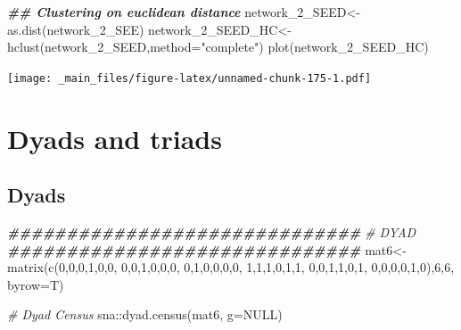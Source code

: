\documentclass[
  notitlepage,
  onecolumn,
  openany]{book}
\newenvironment{Shaded}{\begin{snugshade}}{\end{snugshade}}
\newcommand{\AttributeTok}[1]{\textcolor[rgb]{0.77,0.63,0.00}{#1}}
\newcommand{\CommentTok}[1]{\textcolor[rgb]{0.56,0.35,0.01}{\textit{#1}}}
\newcommand{\ConstantTok}[1]{\textcolor[rgb]{0.00,0.00,0.00}{#1}}
\newcommand{\DecValTok}[1]{\textcolor[rgb]{0.00,0.00,0.81}{#1}}
\newcommand{\DocumentationTok}[1]{\textcolor[rgb]{0.56,0.35,0.01}{\textbf{\textit{#1}}}}
\newcommand{\FunctionTok}[1]{\textcolor[rgb]{0.00,0.00,0.00}{#1}}
\newcommand{\NormalTok}[1]{#1}
\newcommand{\OtherTok}[1]{\textcolor[rgb]{0.56,0.35,0.01}{#1}}
\newcommand{\SpecialCharTok}[1]{\textcolor[rgb]{0.00,0.00,0.00}{#1}}
\newcommand{\StringTok}[1]{\textcolor[rgb]{0.31,0.60,0.02}{#1}}
\begin{document}
\begin{Shaded}
\begin{Highlighting}[]
\DocumentationTok{\#\# Clustering on euclidean distance}
\NormalTok{network\_2\_SEED}\OtherTok{\textless{}{-}}\FunctionTok{as.dist}\NormalTok{(network\_2\_SEE)}
\NormalTok{network\_2\_SEED\_HC}\OtherTok{\textless{}{-}}\FunctionTok{hclust}\NormalTok{(network\_2\_SEED,}\AttributeTok{method=}\StringTok{"complete"}\NormalTok{)}
\FunctionTok{plot}\NormalTok{(network\_2\_SEED\_HC)}
\end{Highlighting}
\end{Shaded}

\texttt{[image: \_main\_files/figure-latex/unnamed-chunk-175-1.pdf]}

\hypertarget{dyads-and-triads}{%
\chapter{Dyads and triads}\label{dyads-and-triads}}

\hypertarget{dyads-1}{%
\section{Dyads}\label{dyads-1}}

\begin{Shaded}
\begin{Highlighting}[]
\DocumentationTok{\#\#\#\#\#\#\#\#\#\#\#\#\#\#\#\#\#\#\#\#\#\#\#\#\#\#\#\#\#\#}
\CommentTok{\# DYAD}
\DocumentationTok{\#\#\#\#\#\#\#\#\#\#\#\#\#\#\#\#\#\#\#\#\#\#\#\#\#\#\#\#\#\#}
\NormalTok{mat6}\OtherTok{\textless{}{-}}\FunctionTok{matrix}\NormalTok{(}\FunctionTok{c}\NormalTok{(}\DecValTok{0}\NormalTok{,}\DecValTok{0}\NormalTok{,}\DecValTok{0}\NormalTok{,}\DecValTok{1}\NormalTok{,}\DecValTok{0}\NormalTok{,}\DecValTok{0}\NormalTok{,}
               \DecValTok{0}\NormalTok{,}\DecValTok{0}\NormalTok{,}\DecValTok{1}\NormalTok{,}\DecValTok{0}\NormalTok{,}\DecValTok{0}\NormalTok{,}\DecValTok{0}\NormalTok{,}
               \DecValTok{0}\NormalTok{,}\DecValTok{1}\NormalTok{,}\DecValTok{0}\NormalTok{,}\DecValTok{0}\NormalTok{,}\DecValTok{0}\NormalTok{,}\DecValTok{0}\NormalTok{,}
               \DecValTok{1}\NormalTok{,}\DecValTok{1}\NormalTok{,}\DecValTok{1}\NormalTok{,}\DecValTok{0}\NormalTok{,}\DecValTok{1}\NormalTok{,}\DecValTok{1}\NormalTok{,}
               \DecValTok{0}\NormalTok{,}\DecValTok{0}\NormalTok{,}\DecValTok{1}\NormalTok{,}\DecValTok{1}\NormalTok{,}\DecValTok{0}\NormalTok{,}\DecValTok{1}\NormalTok{,}
               \DecValTok{0}\NormalTok{,}\DecValTok{0}\NormalTok{,}\DecValTok{0}\NormalTok{,}\DecValTok{0}\NormalTok{,}\DecValTok{1}\NormalTok{,}\DecValTok{0}\NormalTok{),}\DecValTok{6}\NormalTok{,}\DecValTok{6}\NormalTok{, }\AttributeTok{byrow=}\NormalTok{T)}

\CommentTok{\# Dyad Census}
\NormalTok{sna}\SpecialCharTok{::}\FunctionTok{dyad.census}\NormalTok{(mat6, }\AttributeTok{g=}\ConstantTok{NULL}\NormalTok{)}
\end{Highlighting}
\end{Shaded}
\end{document}
